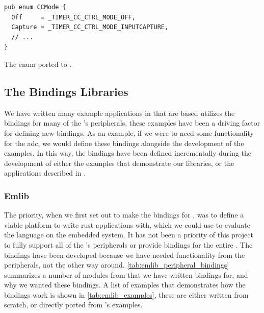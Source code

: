 \begin{listing}[h]
\begin{verbatim}
pub enum CCMode {
  Off     = _TIMER_CC_CTRL_MODE_OFF,
  Capture = _TIMER_CC_CTRL_MODE_INPUTCAPTURE,
  // ...
}
\end{verbatim}
\caption{The enum ported to {\rust}.}
\label{lst:enum_naming_rust}
\end{listing}

\subsection{The Bindings Libraries}
\label{ssub:the_bindings_library}

We have written many example applications in {\rust} that are based utilizes the bindings for many of the {\gecko}'s peripherals, these examples have been a driving factor for defining new bindings.
As an example, if we were to need some functionality for the \gls{adc}, we would define these bindings alongside the development of the examples.
In this way, the bindings have been defined incrementally during the development of either the examples that demonstrate our libraries, or the applications described in .

\subsubsection{Emlib}

The priority, when we first set out to make the bindings for {\emlib}, was to define a viable platform to write rust applications with, which we could use to evaluate the language on the embedded system.
It has not been a priority of this project to fully support all of the {\gecko}'s peripherals or provide bindings for the entire {\emlib}.
The bindings have been developed because we have needed functionality from the peripherals, not the other way around.
\autoref{tab:emlib_peripheral_bindings} summarizes a number of modules from {\emlib} that we have written bindings for, and why we wanted these bindings.
A list of examples that demonstrates how the bindings work is shown in \autoref{tab:emlib_examples}, these are either written from scratch, or directly ported from {\emlib}'s examples.

